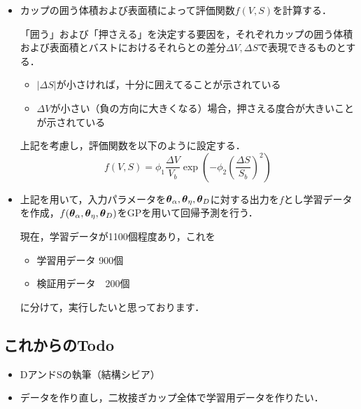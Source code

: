 \documentclass[11pt]{jsarticle}
\begin{document}
\begin{itemize}
				\item カップの囲う体積および表面積によって評価関数$ f(V,S) $を計算する．
				
				「囲う」および「押さえる」を決定する要因を，それぞれカップの囲う体積および表面積とバストにおけるそれらとの差分$\Delta V,\Delta S $で表現できるものとする．
				\begin{itemize}
					\item $ |\Delta S| $が小さければ，十分に囲えてることが示されている
					\item $ \Delta V $が小さい（負の方向に大きくなる）場合，押さえる度合が大きいことが示されている
				\end{itemize}
				上記を考慮し，評価関数を以下のように設定する．
				\begin{equation}\label{eq:EvalFunc}
					f(V,S) = \phi_1 \frac{\Delta V}{V_b} \exp \left(-\phi_2 \left(\frac{\Delta S}{S_b}\right)^2 \right)
				\end{equation}
				
				\item 上記を用いて，入力パラメータを$ \boldsymbol{\theta}_{\alpha},\boldsymbol{\theta}_{\eta},\boldsymbol{\theta}_{D} $に対する出力を$ f $とし学習データを作成，$ f(\boldsymbol{\theta}_{\alpha},\boldsymbol{\theta}_{\eta},\boldsymbol{\theta}_{D}) $をGPを用いて回帰予測を行う．
				
				現在，学習データが1100個程度あり，これを
				\begin{itemize}
					\item 学習用データ 900個
					\item 検証用データ　200個
				\end{itemize}
			に分けて，実行したいと思っております．
			\end{itemize}
		\subsection{これからのTodo}
			\begin{itemize}
				\item DアンドSの執筆（結構シビア）
				\item データを作り直し，二枚接ぎカップ全体で学習用データを作りたい．
			\end{itemize}
			
	\newpage
\vspace{10cm}
	

\vspace{14cm}
	\articleSPRfour
	\articleSPRfive
\end{document}
